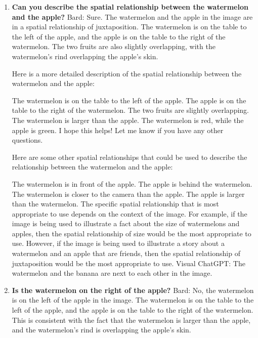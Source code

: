     \begin{enumerate}
        \item \textbf{Can you describe the spatial relationship between the watermelon and the apple?}
        \subitem Bard:
        Sure. The watermelon and the apple in the image are in a spatial relationship of juxtaposition. The watermelon is on the table to the left of the apple, and the apple is on the table to the right of the watermelon. The two fruits are also slightly overlapping, with the watermelon's rind overlapping the apple's skin.

        Here is a more detailed description of the spatial relationship between the watermelon and the apple:

        The watermelon is on the table to the left of the apple.
        The apple is on the table to the right of the watermelon.
        The two fruits are slightly overlapping.
        The watermelon is larger than the apple.
        The watermelon is red, while the apple is green.
        I hope this helps! Let me know if you have any other questions.

        Here are some other spatial relationships that could be used to describe the relationship between the watermelon and the apple:

        The watermelon is in front of the apple.
        The apple is behind the watermelon.
        The watermelon is closer to the camera than the apple.
        The apple is larger than the watermelon.
        The specific spatial relationship that is most appropriate to use depends on the context of the image. For example, if the image is being used to illustrate a fact about the size of watermelons and apples, then the spatial relationship of size would be the most appropriate to use. However, if the image is being used to illustrate a story about a watermelon and an apple that are friends, then the spatial relationship of juxtaposition would be the most appropriate to use.
        \subitem Visual ChatGPT: The watermelon and the banana are next to each other in the image.
        \item \textbf{Is the watermelon on the right of the apple?}
        \subitem Bard: 
        No, the watermelon is on the left of the apple in the image. The watermelon is on the table to the left of the apple, and the apple is on the table to the right of the watermelon. This is consistent with the fact that the watermelon is larger than the apple, and the watermelon's rind is overlapping the apple's skin.
        

\end{enumerate}
